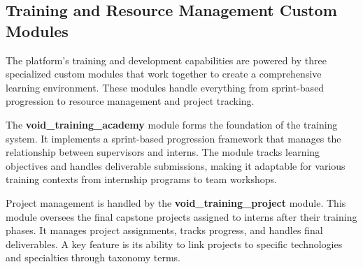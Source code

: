 
\subsection{Training and Resource Management Custom Modules}
The platform's training and development capabilities are powered by three specialized custom modules that work together to create a comprehensive learning environment. These modules handle everything from sprint-based progression to resource management and project tracking.

The \textbf{void\_training\_academy} module forms the foundation of the training system. It implements a sprint-based progression framework that manages the relationship between supervisors and interns. The module tracks learning objectives and handles deliverable submissions, making it adaptable for various training contexts from internship programs to team workshops.

Project management is handled by the \textbf{void\_training\_project} module. This module oversees the final capstone projects assigned to interns after their training phases. It manages project assignments, tracks progress, and handles final deliverables. A key feature is its ability to link projects to specific technologies and specialties through taxonomy terms.

